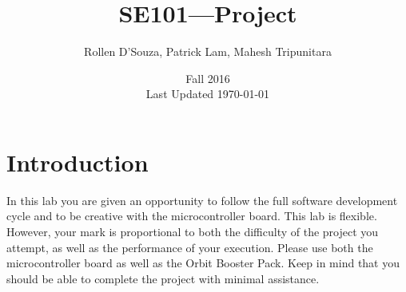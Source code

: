 \documentclass{article}
\begin{document}
\title{SE101---Project}
\author{Rollen D'Souza, Patrick Lam, Mahesh Tripunitara}
\date{Fall 2016\\Last Updated \today}
\maketitle

\section*{Introduction}
In this lab you are given an opportunity to follow the full software development cycle and to be creative with the microcontroller board.  This lab is flexible. However, your mark is proportional to both the difficulty of the project you attempt, as well as the performance of your execution.  Please use both the microcontroller board as well as the Orbit Booster Pack.  Keep in mind that you should be able to complete the project with minimal assistance.
\end{document}

